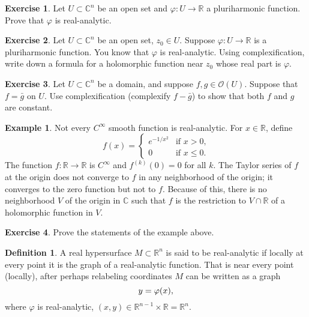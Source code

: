 \documentclass[12pt,openany]{book}
\newcommand{\avoidbreak}{\postdisplaypenalty=100}
\newcommand{\C}{{\mathbb{C}}}
\newcommand{\R}{{\mathbb{R}}}
\newcommand{\sO}{{\mathscr{O}}}
\theoremstyle{plain}
\theoremstyle{remark}
\theoremstyle{definition}
\newtheorem{defn}[thm]{Definition}
\newenvironment{exbox}{%
    \def\FrameCommand{\vrule width 1pt \relax\hspace{10pt}}%
    \MakeFramed{\advance\hsize-\width\FrameRestore}%
}{%
    \endMakeFramed
}
\theoremstyle{exercise}
\newtheorem{exercise}{Exercise}[section]
\theoremstyle{example}
\newtheorem{example}[thm]{Example}
\begin{document}
\begin{exbox}
\begin{exercise}
Let $U \subset \C^n$ be an open set and $\varphi \colon U \to \R$ a
pluriharmonic function.  Prove that $\varphi$ is real-analytic.
\end{exercise}

\begin{exercise}
Let $U \subset \C^n$ be an open set, $z_0 \in U$.
Suppose $\varphi \colon U \to \R$ is a pluriharmonic function.
You know that $\varphi$ is real-analytic.
Using complexification, write down a formula for a holomorphic function near
$z_0$ whose real part is $\varphi$.
\end{exercise}

\begin{exercise}
Let $U \subset \C^n$ be a domain, and suppose $f, g \in \sO(U)$.
Suppose that $f = \bar{g}$ on $U$.  Use complexification (complexify
$f-\bar{g}$) to show that both $f$ and $g$ are constant.
\end{exercise}
\end{exbox}

\begin{example}
Not every $C^\infty$ smooth function is real-analytic.  For $x \in \R$,
define
\begin{equation*}
f(x) =
\begin{cases}
e^{-1/x^2} & \text{if $x > 0$,} \\
0 & \text{if $x \leq 0$.}
\end{cases}
\end{equation*}
The function
$f \colon \R \to \R$ is $C^\infty$ and $f^{(k)}(0) = 0$ for all $k$.
The Taylor series of $f$ at the origin does
not converge to $f$ in any neighborhood of the origin; it converges to the
zero function but not to $f$.
Because of this, there is no neighborhood $V$ of the origin in $\C$ such that
$f$ is the restriction to $V \cap \R$ of a holomorphic function in $V$.
\end{example}

\begin{exbox}
\begin{exercise}
Prove the statements of the example above.
\end{exercise}
\end{exbox}

\begin{defn}
A real hypersurface $M \subset \R^n$ is said to be real-analytic
if locally at every point it is the graph of a real-analytic function.  That
is near every point (locally), after perhaps relabeling coordinates $M$ can be written as
a graph
\begin{equation*}
y = \varphi(x) ,
\avoidbreak
\end{equation*}
where $\varphi$ is real-analytic, $(x,y) \in \R^{n-1} \times \R = \R^n$.
\end{defn}
\end{document}
